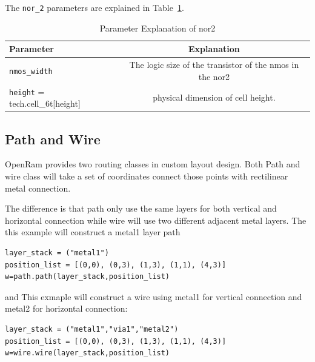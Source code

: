 The \verb|nor_2| parameters are explained in Table~\ref{table:nor2_params}.
\begin{table}[h!] 
  \begin{center}
    \begin{tabular}{| l | c |}
    \hline
    Parameter & Explanation \\ \hline
    \verb|nmos_width| & The logic size of the transistor of the nmos in the nor2 \\ \hline
    \verb|height| = tech.cell\_6t[height] & physical dimension of cell height. \\ 
    \hline
    \end{tabular}
  \end{center}
  \caption{Parameter Explanation of nor2}
  \label{table:nor2_params}
\end{table}



\subsection{Path and Wire}
\label{sec:path and wire}
OpenRam provides two routing classes in custom layout design.
Both Path and wire class will take a set of coordinates connect those points 
with rectilinear metal connection.

The difference is that path only use the same layers for both vertical and 
horizontal connection while wire will use two different adjacent metal layers.
The this example will construct a metal1 layer path
\begin{verbatim}
layer_stack = ("metal1")
position_list = [(0,0), (0,3), (1,3), (1,1), (4,3)]
w=path.path(layer_stack,position_list) 
\end{verbatim}
and This exmaple will construct a wire using metal1 for vertical connection and metal2 for 
horizontal connection:
\begin{verbatim}
layer_stack = ("metal1","via1","metal2")
position_list = [(0,0), (0,3), (1,3), (1,1), (4,3)]
w=wire.wire(layer_stack,position_list)
\end{verbatim}



